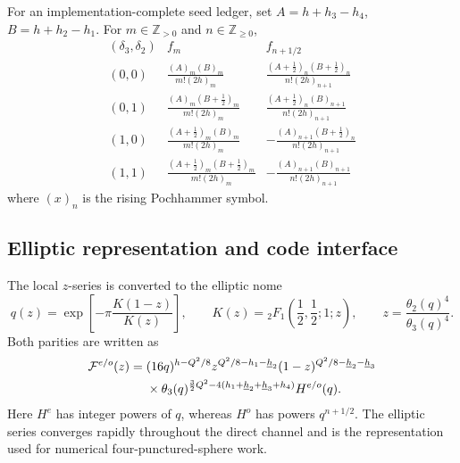 \documentclass[11pt]{article}
\begin{document}
For an implementation-complete seed ledger, set
$A=h+h_3-h_4$, $B=h+h_2-h_1$.  For $m\in\mathbb Z_{>0}$ and
$n\in\mathbb Z_{\geq0}$,
\begin{equation}
\renewcommand{\arraystretch}{1.55}
\begin{array}{c|c|c}
 (\delta_3,\delta_2)&f_m&f_{n+1/2}\\ \hline
 (0,0)&\displaystyle\frac{(A)_m(B)_m}{m!(2h)_m}
 &\displaystyle\frac{(A+\frac12)_n(B+\frac12)_n}{n!(2h)_{n+1}}\\
 (0,1)&\displaystyle\frac{(A)_m(B+\frac12)_m}{m!(2h)_m}
 &\displaystyle\frac{(A+\frac12)_n(B)_{n+1}}{n!(2h)_{n+1}}\\
 (1,0)&\displaystyle\frac{(A+\frac12)_m(B)_m}{m!(2h)_m}
 &\displaystyle-\frac{(A)_{n+1}(B+\frac12)_n}{n!(2h)_{n+1}}\\
 (1,1)&\displaystyle\frac{(A+\frac12)_m(B+\frac12)_m}{m!(2h)_m}
 &\displaystyle-\frac{(A)_{n+1}(B)_{n+1}}{n!(2h)_{n+1}}
\end{array}
\label{eq:ns-block-seeds}
\end{equation}
where $(x)_n$ is the rising Pochhammer symbol.

\subsection{Elliptic representation and code interface}

The local $z$-series is converted to the elliptic nome
\begin{equation}
 q(z)=\exp\!\left[-\pi\frac{K(1-z)}{K(z)}\right],
 \qquad K(z)={}_2F_1\!\left(\frac12,\frac12;1;z\right),
 \qquad z=\frac{\theta_2(q)^4}{\theta_3(q)^4}.
 \label{eq:ns-block-nome}
\end{equation}
Both parities are written as
\begin{align}
 \mathcal F^{e/o}(z)={}&(16q)^{h-Q^2/8}
 z^{Q^2/8-h_1-\underline h_2}
 (1-z)^{Q^2/8-\underline h_2-\underline h_3}\notag\\
 &\times\theta_3(q)^{\frac32Q^2-
 4(h_1+\underline h_2+\underline h_3+h_4)}
 H^{e/o}(q).
 \label{eq:ns-block-elliptic-factorization}
\end{align}
Here $H^e$ has integer powers of $q$, whereas $H^o$ has powers
$q^{n+1/2}$.  The elliptic series converges rapidly throughout the direct
channel and is the representation used for numerical four-punctured-sphere
work.
\end{document}
